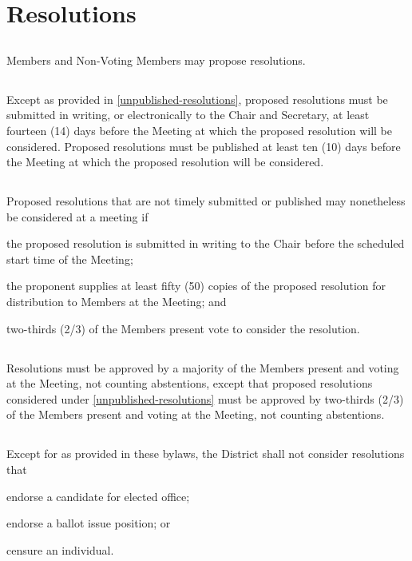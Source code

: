 \section{Resolutions}
\subsection{}
Members and Non-Voting Members may propose resolutions.

\subsection{}
Except as provided in \autoref{unpublished-resolutions}, proposed resolutions must be submitted in writing, or electronically to the Chair and Secretary, at least fourteen (14) days before the Meeting at which the proposed resolution will be considered. Proposed resolutions must be published at least ten (10) days before the Meeting at which the proposed resolution will be considered.

\subsection{} \label{unpublished-resolutions}
Proposed resolutions that are not timely submitted or published may nonetheless be considered at a meeting if
\begin{inlinealphalist}
    \item the proposed resolution is submitted in writing to the Chair before the scheduled start time of the Meeting;
    \item the proponent supplies at least fifty (50) copies of the proposed resolution for distribution to Members at the Meeting; and
    \item two-thirds (2/3) of the Members present vote to consider the resolution.
\end{inlinealphalist}

\subsection{}
Resolutions must be approved by a majority of the Members present and voting at the Meeting, not counting abstentions, except that proposed resolutions considered under \autoref{unpublished-resolutions} must be approved by two-thirds (2/3) of the Members present and voting at the Meeting, not counting abstentions.

\subsection{}
Except for as provided in these bylaws, the \fortythird{} District shall not consider resolutions that
\begin{inlinealphalist}
    \item endorse a candidate for elected office;
    \item endorse a ballot issue position; or
    \item censure an individual.
\end{inlinealphalist}

